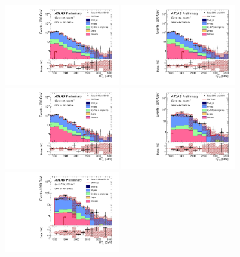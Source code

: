 \clearpage
\begin{figure}[tbp]
\begin{center}
\includegraphics[width=0.45\textwidth]{figures/ATLAS-CONF-2016-078_INT/N-1Plots/AtlasStyle/Preliminary/CRW_SRJigsawSRG1a_LastCut_CRW_minusone}
\includegraphics[width=0.45\textwidth]{figures/ATLAS-CONF-2016-078_INT/N-1Plots/AtlasStyle/Preliminary/CRW_SRJigsawSRG2a_LastCut_CRW_minusone}
\includegraphics[width=0.45\textwidth]{figures/ATLAS-CONF-2016-078_INT/N-1Plots/AtlasStyle/Preliminary/CRW_SRJigsawSRG3a_LastCut_CRW_minusone}
\includegraphics[width=0.45\textwidth]{figures/ATLAS-CONF-2016-078_INT/N-1Plots/AtlasStyle/Preliminary/CRW_SRJigsawSRS1a_LastCut_CRW_minusone}
\includegraphics[width=0.45\textwidth]{figures/ATLAS-CONF-2016-078_INT/N-1Plots/AtlasStyle/Preliminary/CRW_SRJigsawSRS2a_LastCut_CRW_minusone}

\end{center}
\end{figure}
